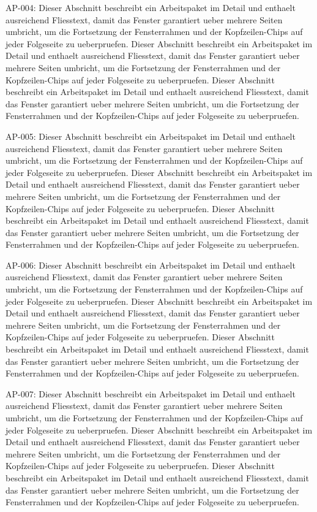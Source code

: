\documentclass[type=report,theme=light,language=de]{semio}
\begin{document}
\begin{Table}[title=Lange Tabelle]
AP-004: Dieser Abschnitt beschreibt ein Arbeitspaket im Detail und enthaelt ausreichend Fliesstext, damit das Fenster garantiert ueber mehrere Seiten umbricht, um die Fortsetzung der Fensterrahmen und der Kopfzeilen-Chips auf jeder Folgeseite zu ueberpruefen. Dieser Abschnitt beschreibt ein Arbeitspaket im Detail und enthaelt ausreichend Fliesstext, damit das Fenster garantiert ueber mehrere Seiten umbricht, um die Fortsetzung der Fensterrahmen und der Kopfzeilen-Chips auf jeder Folgeseite zu ueberpruefen. Dieser Abschnitt beschreibt ein Arbeitspaket im Detail und enthaelt ausreichend Fliesstext, damit das Fenster garantiert ueber mehrere Seiten umbricht, um die Fortsetzung der Fensterrahmen und der Kopfzeilen-Chips auf jeder Folgeseite zu ueberpruefen. 

AP-005: Dieser Abschnitt beschreibt ein Arbeitspaket im Detail und enthaelt ausreichend Fliesstext, damit das Fenster garantiert ueber mehrere Seiten umbricht, um die Fortsetzung der Fensterrahmen und der Kopfzeilen-Chips auf jeder Folgeseite zu ueberpruefen. Dieser Abschnitt beschreibt ein Arbeitspaket im Detail und enthaelt ausreichend Fliesstext, damit das Fenster garantiert ueber mehrere Seiten umbricht, um die Fortsetzung der Fensterrahmen und der Kopfzeilen-Chips auf jeder Folgeseite zu ueberpruefen. Dieser Abschnitt beschreibt ein Arbeitspaket im Detail und enthaelt ausreichend Fliesstext, damit das Fenster garantiert ueber mehrere Seiten umbricht, um die Fortsetzung der Fensterrahmen und der Kopfzeilen-Chips auf jeder Folgeseite zu ueberpruefen. 

AP-006: Dieser Abschnitt beschreibt ein Arbeitspaket im Detail und enthaelt ausreichend Fliesstext, damit das Fenster garantiert ueber mehrere Seiten umbricht, um die Fortsetzung der Fensterrahmen und der Kopfzeilen-Chips auf jeder Folgeseite zu ueberpruefen. Dieser Abschnitt beschreibt ein Arbeitspaket im Detail und enthaelt ausreichend Fliesstext, damit das Fenster garantiert ueber mehrere Seiten umbricht, um die Fortsetzung der Fensterrahmen und der Kopfzeilen-Chips auf jeder Folgeseite zu ueberpruefen. Dieser Abschnitt beschreibt ein Arbeitspaket im Detail und enthaelt ausreichend Fliesstext, damit das Fenster garantiert ueber mehrere Seiten umbricht, um die Fortsetzung der Fensterrahmen und der Kopfzeilen-Chips auf jeder Folgeseite zu ueberpruefen. 

AP-007: Dieser Abschnitt beschreibt ein Arbeitspaket im Detail und enthaelt ausreichend Fliesstext, damit das Fenster garantiert ueber mehrere Seiten umbricht, um die Fortsetzung der Fensterrahmen und der Kopfzeilen-Chips auf jeder Folgeseite zu ueberpruefen. Dieser Abschnitt beschreibt ein Arbeitspaket im Detail und enthaelt ausreichend Fliesstext, damit das Fenster garantiert ueber mehrere Seiten umbricht, um die Fortsetzung der Fensterrahmen und der Kopfzeilen-Chips auf jeder Folgeseite zu ueberpruefen. Dieser Abschnitt beschreibt ein Arbeitspaket im Detail und enthaelt ausreichend Fliesstext, damit das Fenster garantiert ueber mehrere Seiten umbricht, um die Fortsetzung der Fensterrahmen und der Kopfzeilen-Chips auf jeder Folgeseite zu ueberpruefen. 


\end{Table}
\end{document}
